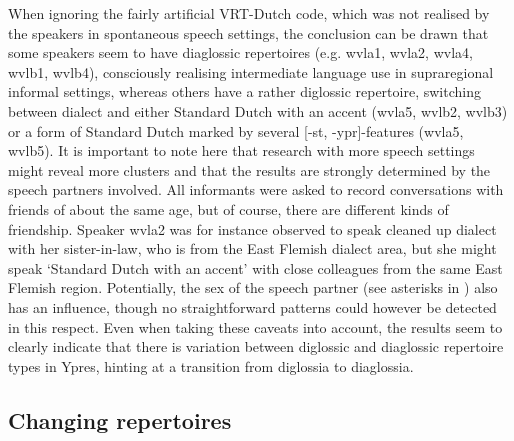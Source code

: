 \documentclass[output=paper]{LSP/langsci}
\begin{document}
When ignoring the fairly artificial VRT-Dutch code, which was not realised by the speakers in spontaneous speech settings, the conclusion can be drawn that some speakers seem to have diaglossic repertoires (e.g. wvla1, wvla2, wvla4, wvlb1, wvlb4), consciously realising intermediate language use in supraregional informal settings, whereas others have a rather diglossic repertoire, switching between dialect and either Standard Dutch with an accent (wvla5, wvlb2, wvlb3) or a form of Standard Dutch marked by several [-st, -ypr]-features (wvla5, wvlb5). It is important to note here that research with more speech settings might reveal more clusters and that the results are strongly determined by the speech partners involved. All informants were asked to record conversations with friends of about the same age, but of course, there are different kinds of friendship. Speaker wvla2 was for instance observed to speak cleaned up dialect with her sister-in-law, who is from the East Flemish dialect area, but she might speak ‘Standard Dutch with an accent’ with close colleagues from the same East Flemish region. Potentially, the sex of the speech partner (see asterisks in ) also has an influence, though no straightforward patterns could however be detected in this respect. Even when taking these caveats into account, the results seem to clearly indicate that there is variation between diglossic and diaglossic repertoire types in Ypres, hinting at a transition from diglossia to diaglossia. 

\subsection{Changing repertoires}
\label{sec:change}
\end{document}
